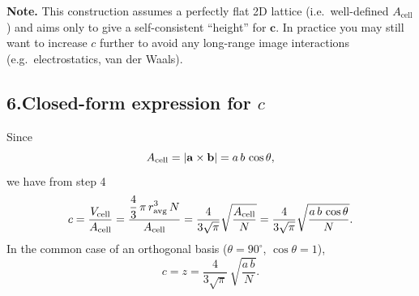 \documentclass{article}
\begin{document}
\textbf{Note.}  This construction assumes a perfectly flat 2D lattice
(i.e.\ well-defined $A_\mathrm{cell}$) and aims only to give a
self-consistent “height” for $\mathbf{c}$.  In practice you may still
want to increase $c$ further to avoid any long-range image interactions
(e.g.\ electrostatics, van der Waals).

\subsection*{6.\quad Closed-form expression for \(c\)}

Since 
\[
A_{\rm cell} = \lvert \mathbf{a}\times\mathbf{b}\rvert 
             = a\,b\,\cos\theta,
\]
we have from step 4
\[
c 
= \frac{V_{\rm cell}}{A_{\rm cell}}
= \frac{\displaystyle\frac{4}{3}\,\pi\,r_{\rm avg}^3\,N}{A_{\rm cell}}
= \frac{4}{3\sqrt{\pi}}
    \sqrt{\frac{A_{\rm cell}}{N}}
= \frac{4}{3\sqrt{\pi}}
    \sqrt{\frac{a\,b\,\cos\theta}{N}}.
\]
In the common case of an orthogonal basis (\(\theta=90^\circ\), \(\cos\theta=1\)),
\[
\boxed{
c 
= z 
= \frac{4}{3\sqrt{\pi}}
  \,\sqrt{\frac{a\,b}{N}}
}.
\]
\end{document}
